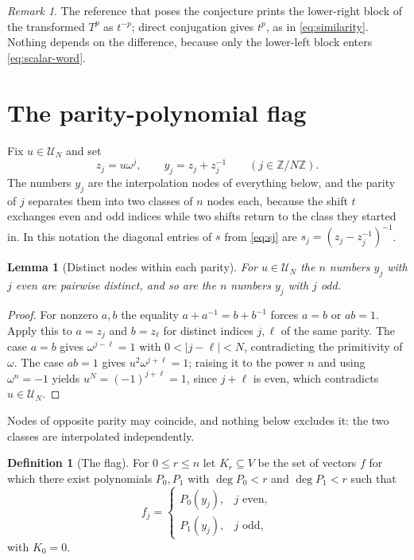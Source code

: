 \documentclass[11pt,reqno]{amsart}
\theoremstyle{plain}
\newtheorem{lemma}[theorem]{Lemma}
\theoremstyle{definition}
\newtheorem{definition}[theorem]{Definition}
\theoremstyle{remark}
\newtheorem{remark}[theorem]{Remark}
\numberwithin{equation}{section}
\begin{document}
\begin{remark}
The reference that poses the conjecture prints the lower-right block of the
transformed $T^{p}$ as $t^{-p}$; direct conjugation gives $t^{p}$, as in
\cref{eq:similarity}. Nothing depends on the difference, because only the
lower-left block enters \cref{eq:scalar-word}.
\end{remark}

\section{The parity-polynomial flag}
\label{sec:flag}

Fix $u\in\mathcal{U}_{N}$ and set
\begin{equation*}
  z_{j}=u\omega^{j},
  \qquad
  y_{j}=z_{j}+z_{j}^{-1}
  \qquad (j\in\mathbb{Z}/N\mathbb{Z}).
\end{equation*}
The numbers $y_{j}$ are the interpolation nodes of everything below, and the
parity of $j$ separates them into two classes of $n$ nodes each, because the
shift $t$ exchanges even and odd indices while two shifts return to the class
they started in. In this notation the diagonal entries of $s$ from
\cref{eq:sj} are $s_{j}=(z_{j}-z_{j}^{-1})^{-1}$.

\begin{lemma}[Distinct nodes within each parity]
\label{lem:nodes}
For $u\in\mathcal{U}_{N}$ the $n$ numbers $y_{j}$ with $j$ even are pairwise
distinct, and so are the $n$ numbers $y_{j}$ with $j$ odd.
\end{lemma}

\begin{proof}
For nonzero $a,b$ the equality $a+a^{-1}=b+b^{-1}$ forces $a=b$ or $ab=1$.
Apply this to $a=z_{j}$ and $b=z_{\ell}$ for distinct indices $j,\ell$ of the
same parity. The case $a=b$ gives $\omega^{j-\ell}=1$ with
$0<|j-\ell|<N$, contradicting the primitivity of $\omega$. The case $ab=1$
gives $u^{2}\omega^{j+\ell}=1$; raising it to the power $n$ and using
$\omega^{n}=-1$ yields $u^{N}=(-1)^{j+\ell}=1$, since $j+\ell$ is even, which
contradicts $u\in\mathcal{U}_{N}$.
\end{proof}

Nodes of opposite parity may coincide, and nothing below excludes it: the two
classes are interpolated independently.

\begin{definition}[The flag]
\label{def:flag}
For $0\le r\le n$ let $K_{r}\subseteq V$ be the set of vectors $f$ for which
there exist polynomials $P_{0},P_{1}$ with
$\deg P_{0}<r$ and $\deg P_{1}<r$ such that
\begin{equation*}
  f_{j}=
  \begin{cases}
    P_{0}(y_{j}), & j \text{ even},\\
    P_{1}(y_{j}), & j \text{ odd},
  \end{cases}
\end{equation*}
with $K_{0}=0$.
\end{definition}
\end{document}
